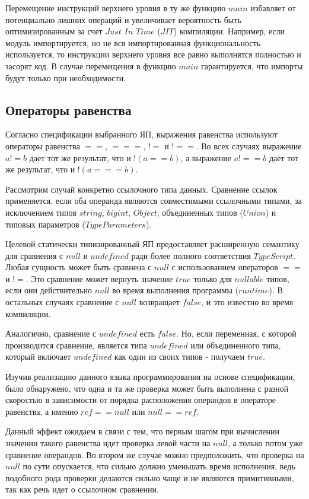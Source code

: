 \documentclass{mipt-thesis-bs}
\begin{document}
Перемещение инструкций верхнего уровня
в ту же функцию $main$ избавляет от потенциально лишних операций
и увеличивает вероятность быть оптимизированным за счет $Just$ $In$ $Time$
($JIT$) компиляции.
Например, если модуль импортируется, но не вся импортированная
функциональность используется, то инструкции верхнего уровня все
равно выполнятся полностью и засорят код. В случае перемещения в
функцию $main$ гарантируется, что импорты будут  только
при необходимости.

\subsection{Операторы равенства}

Согласно спецификации выбранного ЯП, выражения равенства
используют операторы равенства $==$, $===$, $!=$ и $!==$.
Во всех случаях выражение $a != b$ дает тот же результат,
что и $!(a == b)$, а выражение $a !== b$ дает тот же результат, что и $!(a === b)$.

Рассмотрим случай конкретно ссылочного типа данных. Сравнение ссылок применяется,
если оба операнда являются совместимыми ссылочными типами,
за исключением типов $string$, $bigint$, $Object$, объединенных типов
($Union$) и типовых параметров ($Type Parameters$).

Целевой статически типизированный ЯП предоставляет
расширенную семантику для сравнения с $null$ и $undefined$
ради более полного соответствия $TypeScript$. Любая сущность может
быть сравнена с $null$ с использованием операторов $==$ и $!=$. Это
сравнение может вернуть значение $true$ только для $nullable$ типов,
если они действительно $null$ во время выполнения
программы ($runtime$). В остальных случаях сравнение с $null$ возвращает $false$,
и это известно во время компиляции.

Аналогично, сравнение с $undefined$ есть $false$. Но, если
переменная, с которой производится сравнение, является типа
$undefined$ или объединенного типа, который включает
$undefined$ как один из своих типов - получаем $true$.

Изучив реализацию данного языка программирования на основе
спецификации, было обнаружено,
что одна и та же проверка может быть выполнена с разной скоростью в
зависимости от порядка расположения операндов в операторе равенства, а
именно $ref == null$ или $null == ref$.

Данный эффект ожидаем в связи с тем, что первым шагом при вычислении
значении такого равенства идет проверка левой части на $null$, а
только потом уже сравнение операндов. Во втором же случае можно
предположить, что проверка на $null$ по сути опускается, что сильно
должно уменьшать время исполнения, ведь подобного рода проверки делаются
сильно чаще и не являются примитивными, так как речь идет о ссылочном
сравнении.
\end{document}
